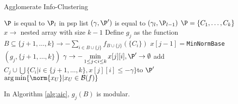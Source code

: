 \begin{algorithm}
\caption{Agglomerate Info-Clustering}\label{alg:aic}
	\begin{algorithmic}[1]
		\REQUIRE $\P$ is equal to $\P_l$ in psp list
		\ENSURE $(\gamma, \P')$ is equal to $(\gamma_l, \P_{l-1})$
		\STATE $\P = \{C_1, \dots, C_k\}$
		\STATE $x \to $ nested array with size $k-1$
			\STATE Define $g_j$ as the function $B \subseteq \{j+1, \dots, k\} \to 
			-\sum_{i\in B\cup\{j\}} f_{B\cup \{j\}} (\{C_i\})$
			\STATE $x[j-1] = $\texttt{MinNormBase}$(g_j, \{j+1, \dots, k\})$
		\ENDFOR
		\STATE $\gamma \to - \displaystyle\min_{1 \leq j<i\leq k} x[j][i], \P' \to \emptyset$
			\STATE add $C_j \cup \bigcup\{C_i | i\in\{j+1, \dots, k\}, x[j][i]\leq -\gamma\}$to $\P'$
			\ENDIF
		\ENDFOR
		\RETURN $\arg\min \{\norm{x_U} | x_U \in \mathcal{B}(f)\}$
		\ENDFUNCTION
	\end{algorithmic}
\end{algorithm}
In Algorithm \ref{alg:aic}, $g_j(B)$ is modular.